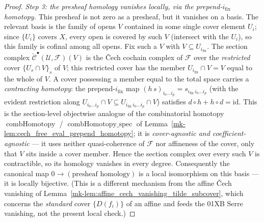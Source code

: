 \begin{proof}
  \emph{Step 3: the presheaf homology vanishes locally, via the prepend-\(i_{\mathrm{fix}}\) homotopy.}
  This presheaf is not zero as a presheaf, but it vanishes on a basis. The relevant basis is the family
  of opens \(V\) contained in some single cover element \(U_i\); since \(\{U_i\}\) covers \(X\), every
  open is covered by such \(V\) (intersect with the \(U_i\)), so this family is cofinal among all opens.
  Fix such a \(V\) with \(V \subseteq U_{i_{\mathrm{fix}}}\). The section complex
  \(\check{\mathcal{C}}^\bullet(\mathcal{U}, \mathcal{F})(V)\) is the {\v C}ech cochain complex of
  \(\mathcal{F}\) over the \emph{restricted} cover \(\{U_s \cap V\}_s\) of \(V\); this restricted cover
  has the member \(U_{i_{\mathrm{fix}}} \cap V = V\) equal to the whole of \(V\). A cover possessing a
  member equal to the total space carries a \emph{contracting homotopy}: the prepend-\(i_{\mathrm{fix}}\)
  map \((h\,s)_{i_0 \ldots i_p} = s_{i_{\mathrm{fix}}\, i_0 \ldots i_p}\) (with the evident
  restriction along \(U_{i_0 \ldots i_p} \cap V \subseteq U_{i_{\mathrm{fix}}\, i_0 \ldots i_p} \cap V\))
  satisfies \(d \circ h + h \circ d = \mathrm{id}\). This is the section-level objectwise analogue of the
  combinatorial homotopy \(\operatorname{combHomotopy}\) /
  \(\operatorname{combHomotopy\_spec}\) of Lemma~\ref{mk-lem:cech_free_eval_prepend_homotopy}; it is
  \emph{cover-agnostic and coefficient-agnostic} --- it uses neither quasi-coherence of \(\mathcal{F}\)
  nor affineness of the cover, only that \(V\) sits inside a cover member. Hence the section complex over
  every such \(V\) is contractible, so its homology vanishes in every degree. Consequently the canonical
  map \(0 \to (\text{presheaf homology})\) is a local isomorphism on this basis --- it is locally
  bijective. (This is a different mechanism from the affine {\v C}ech vanishing of
  Lemma~\ref{mk-lem:affine_cech_vanishing_tilde_subcover}, which concerns the \emph{standard} cover
  \(\{D(f_i)\}\) of an affine and feeds the 01XB Serre vanishing, not the present local check.)


\end{proof}
